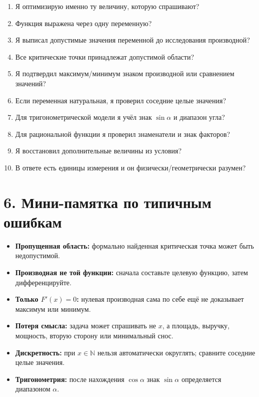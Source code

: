 \documentclass[a4paper,12pt]{article}
\newcommand{\important}[1]{\textcolor{warn}{\textbf{#1}}}
\newcommand{\N}{\mathbb{N}}
\begin{document}
\begin{enumerate}[label=\textbf{\arabic*.}]
  \item Я оптимизирую именно ту величину, которую спрашивают?
  \item Функция выражена через одну переменную?
  \item Я выписал допустимые значения переменной до исследования производной?
  \item Все критические точки принадлежат допустимой области?
  \item Я подтвердил максимум/минимум знаком производной или сравнением значений?
  \item Если переменная натуральная, я проверил соседние целые значения?
  \item Для тригонометрической модели я учёл знак \(\sin\alpha\) и диапазон угла?
  \item Для рациональной функции я проверил знаменатели и знак факторов?
  \item Я восстановил дополнительные величины из условия?
  \item В ответе есть единицы измерения и он физически/геометрически разумен?
\end{enumerate}

\section*{6. Мини-памятка по типичным ошибкам}
\begin{itemize}
  \item \important{Пропущенная область:} формально найденная критическая точка может быть недопустимой.
  \item \important{Производная не той функции:} сначала составьте целевую функцию, затем дифференцируйте.
  \item \important{Только \(F'(x)=0\):} нулевая производная сама по себе ещё не доказывает максимум или минимум.
  \item \important{Потеря смысла:} задача может спрашивать не \(x\), а площадь, выручку, мощность, вторую сторону или минимальный снос.
  \item \important{Дискретность:} при \(x\in\N\) нельзя автоматически округлять; сравните соседние целые значения.
  \item \important{Тригонометрия:} после нахождения \(\cos\alpha\) знак \(\sin\alpha\) определяется диапазоном \(\alpha\).
\end{itemize}

\clearpage
\end{document}
